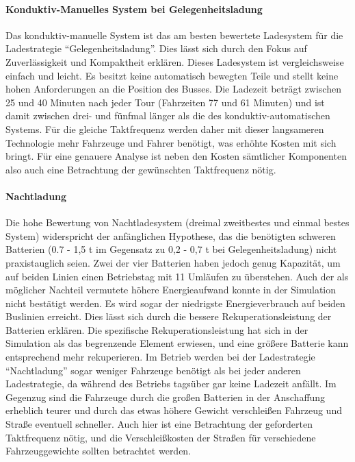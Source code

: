 \paragraph{Konduktiv-Manuelles System bei Gelegenheitsladung} Das konduktiv-manuelle System ist das am besten bewertete Ladesystem für die Ladestrategie "`Gelegenheitsladung"'. Dies lässt sich durch den Fokus auf Zuverlässigkeit und Kompaktheit erklären. Dieses Ladesystem ist vergleichsweise einfach und leicht. Es besitzt keine automatisch bewegten Teile und stellt keine hohen Anforderungen an die Position des Busses. Die Ladezeit beträgt zwischen 25 und 40 Minuten nach jeder Tour (Fahrzeiten 77 und 61 Minuten) und ist damit zwischen drei- und fünfmal länger als die des konduktiv-automatischen Systems. Für die gleiche Taktfrequenz werden daher mit dieser langsameren Technologie mehr Fahrzeuge und Fahrer benötigt, was erhöhte Kosten mit sich bringt. Für eine genauere Analyse ist neben den Kosten sämtlicher Komponenten also auch eine Betrachtung der gewünschten Taktfrequenz nötig.

\paragraph{Nachtladung} Die hohe Bewertung von Nachtladesystem (dreimal zweitbestes und einmal bestes System) widerspricht der anfänglichen Hypothese, das die benötigten schweren Batterien (0.7 - 1,5 t im Gegensatz zu 0,2 - 0,7 t bei Gelegenheitsladung) nicht praxistauglich seien. Zwei der vier Batterien haben jedoch genug Kapazität, um auf beiden Linien einen Betriebstag mit 11 Umläufen zu überstehen. Auch der als möglicher Nachteil vermutete höhere Energieaufwand konnte in der Simulation nicht bestätigt werden. Es wird sogar der niedrigste Energieverbrauch auf beiden Buslinien erreicht. Dies lässt sich durch die bessere Rekuperationsleistung der Batterien erklären. Die spezifische Rekuperationsleistung hat sich in der Simulation als das begrenzende Element erwiesen, und eine größere Batterie kann entsprechend mehr rekuperieren. Im Betrieb werden bei der Ladestrategie "`Nachtladung"' sogar weniger Fahrzeuge benötigt als bei jeder anderen Ladestrategie, da während des Betriebs tagsüber gar keine Ladezeit anfällt. Im Gegenzug sind die Fahrzeuge durch die großen Batterien in der Anschaffung erheblich teurer und durch das etwas höhere Gewicht verschleißen Fahrzeug und Straße eventuell schneller. Auch hier ist eine Betrachtung der geforderten Taktfrequenz nötig, und die Verschleißkosten der Straßen für verschiedene Fahrzeuggewichte sollten betrachtet werden.

